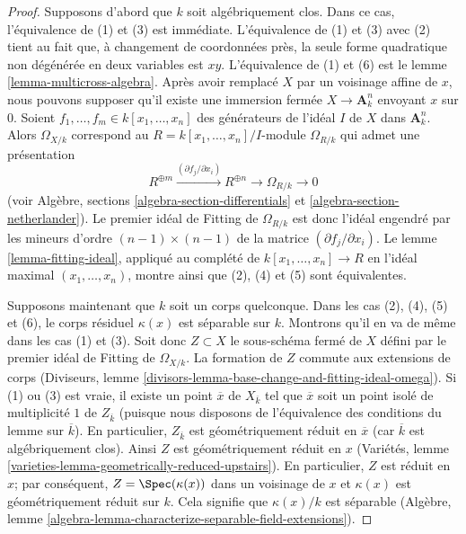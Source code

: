 \begin{proof}
Supposons d'abord que $k$ soit algébriquement clos. Dans ce cas, l'équivalence de (1) et (3) est immédiate. L'équivalence de (1) et (3) avec (2) tient au fait que, à changement de coordonnées près, la seule forme quadratique non dégénérée en deux variables est $xy$. L'équivalence de (1) et (6) est le lemme \ref{lemma-multicross-algebra}. Après avoir remplacé $X$ par un voisinage affine de $x$, nous pouvons supposer qu'il existe une immersion fermée $X \to \mathbf{A}^n_k$ envoyant $x$ sur $0$. Soient $f_1, \ldots, f_m \in k[x_1, \ldots, x_n]$ des générateurs de l'idéal $I$ de $X$ dans $\mathbf{A}^n_k$. Alors $\Omega_{X/k}$ correspond au $R = k[x_1, \ldots, x_n]/I$-module $\Omega_{R/k}$ qui admet une présentation $$
R^{\oplus m} \xrightarrow{(\partial f_j/\partial x_i)}
R^{\oplus n} \to \Omega_{R/k} \to 0
$$ (voir Algèbre, sections \ref{algebra-section-differentials} et \ref{algebra-section-netherlander}). Le premier idéal de Fitting de $\Omega_{R/k}$ est donc l'idéal engendré par les mineurs d'ordre $(n - 1) \times (n - 1)$ de la matrice $(\partial f_j/\partial x_i)$. Le lemme \ref{lemma-fitting-ideal}, appliqué au complété de $k[x_1, \ldots, x_n] \to R$ en l'idéal maximal $(x_1, \ldots, x_n)$, montre ainsi que (2), (4) et (5) sont équivalentes.

\medskip\noindent
Supposons maintenant que $k$ soit un corps quelconque. Dans les cas (2), (4), (5) et (6), le corps résiduel $\kappa(x)$ est séparable sur $k$. Montrons qu'il en va de même dans les cas (1) et (3). Soit donc $Z \subset X$ le sous-schéma fermé de $X$ défini par le premier idéal de Fitting de $\Omega_{X/k}$. La formation de $Z$ commute aux extensions de corps (Diviseurs, lemme \ref{divisors-lemma-base-change-and-fitting-ideal-omega}). Si (1) ou (3) est vraie, il existe un point $\overline{x}$ de $X_{\overline{k}}$ tel que $\overline{x}$ soit un point isolé de multiplicité $1$ de $Z_{\overline{k}}$ (puisque nous disposons de l'équivalence des conditions du lemme sur $\overline{k}$). En particulier, $Z_{\overline{k}}$ est géométriquement réduit en $\overline{x}$ (car $\overline{k}$ est algébriquement clos). Ainsi $Z$ est géométriquement réduit en $x$ (Variétés, lemme \ref{varieties-lemma-geometrically-reduced-upstairs}). En particulier, $Z$ est réduit en $x$; par conséquent, $Z = \Spec(\kappa(x))$ dans un voisinage de $x$ et $\kappa(x)$ est géométriquement réduit sur $k$. Cela signifie que $\kappa(x)/k$ est séparable (Algèbre, lemme \ref{algebra-lemma-characterize-separable-field-extensions}).


\end{proof}
